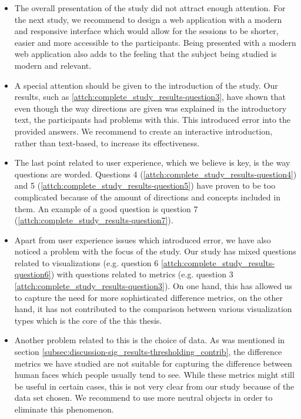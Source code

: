 \begin{itemize}
	\item The overall presentation of the study did not attract enough attention. For the next study, we recommend to design a web application with a modern and responsive interface which would allow for the sessions to be shorter, easier and more accessible to the participants. Being presented with a modern web application also adds to the feeling that the subject being studied is modern and relevant.
	\item A special attention should be given to the introduction of the study. Our results, such as \ref{attch:complete_study_results-question3}, have shown that even though the way directions are given was explained in the introductory text, the participants had problems with this. This introduced error into the provided answers. We recommend to create an interactive introduction, rather than text-based, to increase its effectiveness.
	\item The last point related to user experience, which we believe is key, is the way questions are worded. Questions 4 (\ref{attch:complete_study_results-question4}) and 5 (\ref{attch:complete_study_results-question5}) have proven to be too complicated because of the amount of directions and concepts included in them. An example of a good question is question 7 (\ref{attch:complete_study_results-question7}).
	\item Apart from user experience issues which introduced error, we have also noticed a problem with the focus of the study. Our study has mixed questions related to visualizations (e.g. question 6 \ref{attch:complete_study_results-question6}) with questions related to metrics (e.g. question 3 \ref{attch:complete_study_results-question3}). On one hand, this has allowed us to capture the need for more sophisticated difference metrics, on the other hand, it has not contributed to the comparison between various visualization types which is the core of the this thesis.
	\item Another problem related to this is the choice of data. As was mentioned in section \ref{subsec:discussion-sig_results-thresholding_contrib}, the difference metrics we have studied are not suitable for capturing the difference between human faces which people usually tend to see. While these metrics might still be useful in certain cases, this is not very clear from our study because of the data set chosen. We recommend to use more neutral objects in order to eliminate this phenomenon.
\end{itemize}

